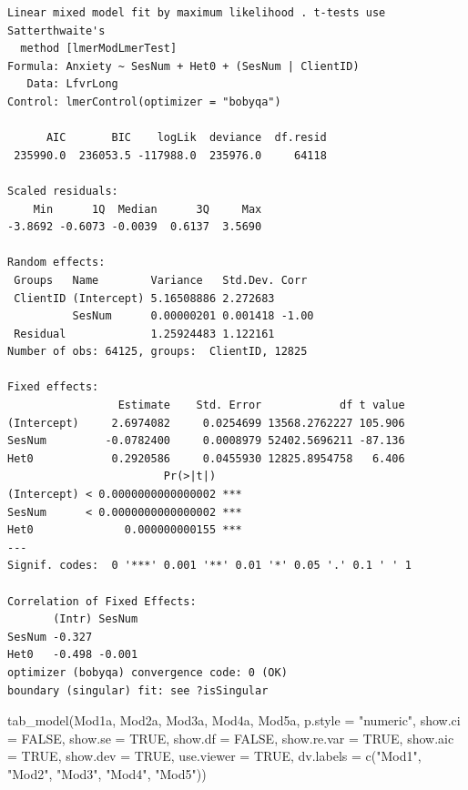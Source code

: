 \documentclass[
  11pt,
]{book}
\newenvironment{Shaded}{\begin{snugshade}}{\end{snugshade}}
\newcommand{\AttributeTok}[1]{\textcolor[rgb]{0.77,0.63,0.00}{#1}}
\newcommand{\ConstantTok}[1]{\textcolor[rgb]{0.00,0.00,0.00}{#1}}
\newcommand{\FunctionTok}[1]{\textcolor[rgb]{0.00,0.00,0.00}{#1}}
\newcommand{\NormalTok}[1]{#1}
\newcommand{\StringTok}[1]{\textcolor[rgb]{0.31,0.60,0.02}{#1}}
\begin{document}
\begin{verbatim}
Linear mixed model fit by maximum likelihood . t-tests use Satterthwaite's
  method [lmerModLmerTest]
Formula: Anxiety ~ SesNum + Het0 + (SesNum | ClientID)
   Data: LfvrLong
Control: lmerControl(optimizer = "bobyqa")

      AIC       BIC    logLik  deviance  df.resid 
 235990.0  236053.5 -117988.0  235976.0     64118 

Scaled residuals: 
    Min      1Q  Median      3Q     Max 
-3.8692 -0.6073 -0.0039  0.6137  3.5690 

Random effects:
 Groups   Name        Variance   Std.Dev. Corr 
 ClientID (Intercept) 5.16508886 2.272683      
          SesNum      0.00000201 0.001418 -1.00
 Residual             1.25924483 1.122161      
Number of obs: 64125, groups:  ClientID, 12825

Fixed effects:
                 Estimate    Std. Error            df t value
(Intercept)     2.6974082     0.0254699 13568.2762227 105.906
SesNum         -0.0782400     0.0008979 52402.5696211 -87.136
Het0            0.2920586     0.0455930 12825.8954758   6.406
                        Pr(>|t|)    
(Intercept) < 0.0000000000000002 ***
SesNum      < 0.0000000000000002 ***
Het0              0.000000000155 ***
---
Signif. codes:  0 '***' 0.001 '**' 0.01 '*' 0.05 '.' 0.1 ' ' 1

Correlation of Fixed Effects:
       (Intr) SesNum
SesNum -0.327       
Het0   -0.498 -0.001
optimizer (bobyqa) convergence code: 0 (OK)
boundary (singular) fit: see ?isSingular
\end{verbatim}

\begin{Shaded}
\begin{Highlighting}[]
\FunctionTok{tab\_model}\NormalTok{(Mod1a, Mod2a, Mod3a, Mod4a, Mod5a, }\AttributeTok{p.style =} \StringTok{"numeric"}\NormalTok{, }\AttributeTok{show.ci =} \ConstantTok{FALSE}\NormalTok{, }\AttributeTok{show.se =} \ConstantTok{TRUE}\NormalTok{, }\AttributeTok{show.df =} \ConstantTok{FALSE}\NormalTok{, }\AttributeTok{show.re.var =} \ConstantTok{TRUE}\NormalTok{, }\AttributeTok{show.aic =} \ConstantTok{TRUE}\NormalTok{, }\AttributeTok{show.dev =} \ConstantTok{TRUE}\NormalTok{, }\AttributeTok{use.viewer =} \ConstantTok{TRUE}\NormalTok{, }\AttributeTok{dv.labels =} \FunctionTok{c}\NormalTok{(}\StringTok{"Mod1"}\NormalTok{, }\StringTok{"Mod2"}\NormalTok{, }\StringTok{"Mod3"}\NormalTok{, }\StringTok{"Mod4"}\NormalTok{, }\StringTok{"Mod5"}\NormalTok{))}
\end{Highlighting}
\end{Shaded}
\end{document}

